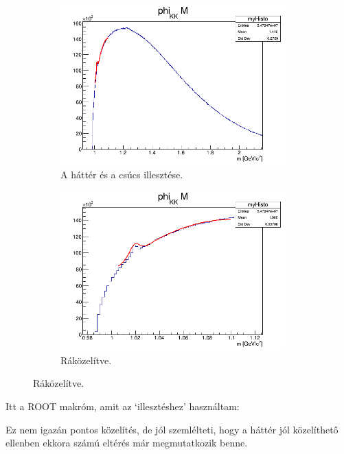 \documentclass[a4paper,12pt]{article}
\begin{document}
\begin{figure}[H]
	\centering
	\begin{subfigure}{0.49\textwidth}
		\centering
		\includegraphics[width=0.95\textwidth]{phi_KK_Mfit.png}
		\caption{ A háttér és a csúcs illesztése. }
	\end{subfigure}
	\begin{subfigure}{0.49\textwidth}
		\centering
		\includegraphics[width=0.95\textwidth]{phi_KK_Mfitzoom.png}
		\caption{ Ráközelítve. }
	\end{subfigure}
\end{figure}
\par Itt a ROOT makróm, amit az `illesztéshez' használtam:

\par Ez nem igazán pontos közelítés, de jól szemlélteti, hogy a háttér jól közelíthető ellenben ekkora számú eltérés már megmutatkozik benne.
\end{document}
